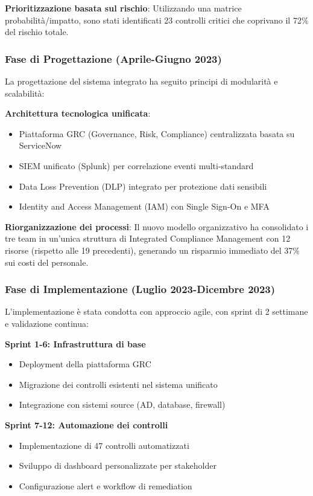 \textbf{Prioritizzazione basata sul rischio}: Utilizzando una matrice probabilità/impatto, sono stati identificati 23 controlli critici che coprivano il 72\% del rischio totale.

\subsubsection{Fase di Progettazione (Aprile-Giugno 2023)}

La progettazione del sistema integrato ha seguito principi di modularità e scalabilità:

\textbf{Architettura tecnologica unificata}:
\begin{itemize}
    \item Piattaforma GRC (Governance, Risk, Compliance) centralizzata basata su ServiceNow
    \item SIEM unificato (Splunk) per correlazione eventi multi-standard
    \item Data Loss Prevention (DLP) integrato per protezione dati sensibili
    \item Identity and Access Management (IAM) con Single Sign-On e MFA
\end{itemize}

\textbf{Riorganizzazione dei processi}:
Il nuovo modello organizzativo ha consolidato i tre team in un'unica struttura di Integrated Compliance Management con 12 risorse (rispetto alle 19 precedenti), generando un risparmio immediato del 37\% sui costi del personale.

\subsubsection{Fase di Implementazione (Luglio 2023-Dicembre 2023)}

L'implementazione è stata condotta con approccio agile, con sprint di 2 settimane e validazione continua:

\textbf{Sprint 1-6: Infrastruttura di base}
\begin{itemize}
    \item Deployment della piattaforma GRC
    \item Migrazione dei controlli esistenti nel sistema unificato
    \item Integrazione con sistemi source (AD, database, firewall)
\end{itemize}

\textbf{Sprint 7-12: Automazione dei controlli}
\begin{itemize}
    \item Implementazione di 47 controlli automatizzati
    \item Sviluppo di dashboard personalizzate per stakeholder
    \item Configurazione alert e workflow di remediation
\end{itemize}

